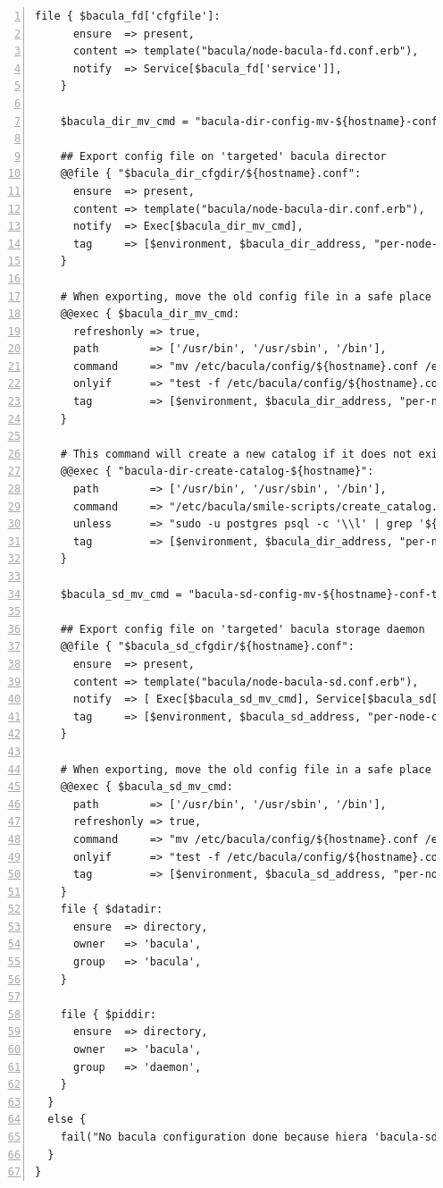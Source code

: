 \documentclass[14 pt,a4paper]{extreport}
\begin{document}
\begin{framed}
\begin{Verbatim}[fontsize=\tiny,numbers=left]
    file { $bacula_fd['cfgfile']:
      ensure  => present,
      content => template("bacula/node-bacula-fd.conf.erb"),
      notify  => Service[$bacula_fd['service']],
    }

    $bacula_dir_mv_cmd = "bacula-dir-config-mv-${hostname}-conf-to-old"

    ## Export config file on 'targeted' bacula director
    @@file { "$bacula_dir_cfgdir/${hostname}.conf":
      ensure  => present,
      content => template("bacula/node-bacula-dir.conf.erb"),
      notify  => Exec[$bacula_dir_mv_cmd],
      tag     => [$environment, $bacula_dir_address, "per-node-config-bacula-dir"],
    }

    # When exporting, move the old config file in a safe place
    @@exec { $bacula_dir_mv_cmd:
      refreshonly => true,
      path        => ['/usr/bin', '/usr/sbin', '/bin'],
      command     => "mv /etc/bacula/config/${hostname}.conf /etc/bacula/config-old/${hostname}.conf",
      onlyif      => "test -f /etc/bacula/config/${hostname}.conf",
      tag         => [$environment, $bacula_dir_address, "per-node-config-bacula-dir"],
    }

    # This command will create a new catalog if it does not exists
    @@exec { "bacula-dir-create-catalog-${hostname}":
      path        => ['/usr/bin', '/usr/sbin', '/bin'],
      command     => "/etc/bacula/smile-scripts/create_catalog.sh ${hostname}",
      unless      => "sudo -u postgres psql -c '\\l' | grep '${hostname}-catalog'",
      tag         => [$environment, $bacula_dir_address, "per-node-config-bacula-dir"],
    }

    $bacula_sd_mv_cmd = "bacula-sd-config-mv-${hostname}-conf-to-old"

    ## Export config file on 'targeted' bacula storage daemon
    @@file { "$bacula_sd_cfgdir/${hostname}.conf":
      ensure  => present,
      content => template("bacula/node-bacula-sd.conf.erb"),
      notify  => [ Exec[$bacula_sd_mv_cmd], Service[$bacula_sd['service']] ],
      tag     => [$environment, $bacula_sd_address, "per-node-config-bacula-sd"],
    }

    # When exporting, move the old config file in a safe place
    @@exec { $bacula_sd_mv_cmd:
      path        => ['/usr/bin', '/usr/sbin', '/bin'],
      refreshonly => true,
      command     => "mv /etc/bacula/config/${hostname}.conf /etc/bacula/config-old/${hostname}.conf",
      onlyif      => "test -f /etc/bacula/config/${hostname}.conf",
      tag         => [$environment, $bacula_sd_address, "per-node-config-bacula-sd"],
    }
    file { $datadir:
      ensure  => directory,
      owner   => 'bacula',
      group   => 'bacula',
    }

    file { $piddir:
      ensure  => directory,
      owner   => 'bacula',
      group   => 'daemon',
    }
  }
  else {
    fail("No bacula configuration done because hiera 'bacula-sd-config' key not found.")
  }
}\end{Verbatim}
\end{framed}
\end{document}

